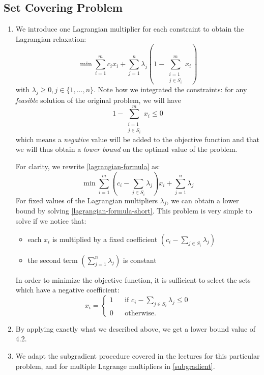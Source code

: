 \subsection{Set Covering Problem}

\begin{enumerate}
    \item We introduce one Lagrangian multiplier for each constraint to obtain the Lagrangian relaxation:
    \begin{equation}
        \label{lagrangian-formula}
        \min \sum_{i=1}^m c_i x_i + \sum_{j=1}^n \lambda_j \left( 1 - \sum_{\substack{i=1\\j \in S_i}}^m x_i \right)
    \end{equation}
    with $\lambda_j \ge 0, j \in \{1,\ldots,n\}$.
    Note how we integrated the constraints: for any \textit{feasible} solution of the original problem, we will have
    \begin{equation}
        1 - \sum_{\substack{i=1\\j \in S_i}}^m x_i \le 0
    \end{equation}
    which means a \textit{negative} value will be added to the objective function and that we will thus obtain a \textit{lower bound} on the optimal value of the problem.


    For clarity, we rewrite \cref{lagrangian-formula} as:
    \begin{equation}
    \label{lagrangian-formula-short}
        \min \sum_{i=1}^m \left( c_i - \sum_{j \in S_i} \lambda_j \right) x_i + \sum_{j=1}^n \lambda_j
    \end{equation}
    For fixed values of the Lagrangian multipliers $\lambda_j$, we can obtain a lower bound by solving \cref{lagrangian-formula-short}.
    This problem is very simple to solve if we notice that:
    \begin{itemize}
        \item each $x_i$ is multiplied by a fixed coefficient $\left(c_i - \sum_{j \in S_i} \lambda_j\right)$
        \item the second term $\left(\sum_{j=1}^n \lambda_j\right)$ is constant
    \end{itemize}
    In order to minimize the objective function, it is sufficient to select the sets which have a negative coefficient:
    \begin{equation}
        x_i = \left\{ \begin{array}{lcl}
         	1 && \text{if $c_i - \sum_{j \in S_i} \lambda_j \le 0$} \\
        	0 && \text{otherwise.}
         \end{array} \right.
    \end{equation}
    \item By applying exactly what we described above, we get a lower bound value of 4.2.
    \item We adapt the subgradient procedure covered in the lectures for this particular problem, and for multiple Lagrange multipliers in \cref{subgradient}.


\end{enumerate}
